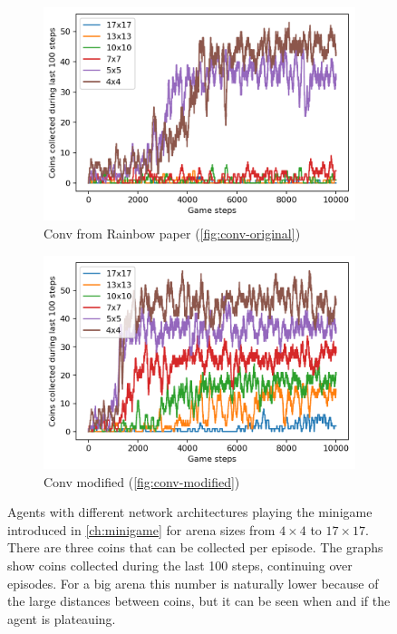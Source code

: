\begin{figure}
\begin{subfigure}[b]{0.48\linewidth}
    	\includegraphics[width=\linewidth]{images/minigame-conv8-4-3-arch.png}
    \caption{Conv from Rainbow paper\cite{Hessel2018RainbowCI} (\ref{fig:conv-original})}
    \label{fig:network-conv843}
  \end{subfigure}
  \quad
  \begin{subfigure}[b]{0.48\linewidth}
    \centering
      \includegraphics[width=\linewidth]{images/minigame-conv1-4-3-arch.png}
    \caption{Conv modified (\ref{fig:conv-modified})}
    \label{fig:network-conv143}
  \end{subfigure}
  \caption{Agents with different network architectures playing the minigame introduced in \ref{ch:minigame} for arena sizes from $4\times4$ to $17\times17$. There are three coins that can be collected per episode. The graphs show coins collected during the last 100 steps, continuing over episodes. For a big arena this number is naturally lower because of the large distances between coins, but it can be seen when and if the agent is plateauing.}
  \label{fig:networks}
\end{figure}

